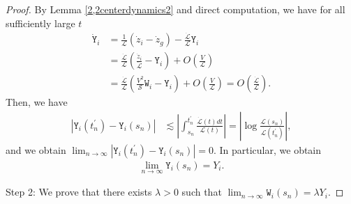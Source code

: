 \documentclass[10pt,a4paper]{amsart}
\numberwithin{equation}{section}
\begin{document}
\begin{proof}
By Lemma \ref{2,2centerdynamics2} and direct computation, we have for all sufficiently large $t$
\begin{align*}
\dot{\mathtt{Y}}_i&=\frac{1}{\mathcal{L}}\left(\dot{z}_i-\dot{z}_g\right)-\frac{\dot{\mathcal{L}}}{\mathcal{L}}\mathtt{Y}_i
\\
&=\frac{\dot{\mathcal{L}}}{\mathcal{L}}\left(\frac{\dot{z}_i}{\dot{\mathcal{L}}}-\mathtt{Y}_i\right)+O\left(\frac{V}{\mathcal{L}}\right)
\\
&=\frac{\dot{\mathcal{L}}}{\mathcal{L}}\left(\frac{V^2}{\mathcal{S}}\mathtt{W}_i-\mathtt{Y}_i \right)+O\left(\frac{V}{\mathcal{L}}\right)=O\left(\frac{\dot{\mathcal{L}}}{\mathcal{L}}\right).
\end{align*}
Then, we have
\begin{align*}
\left|\mathtt{Y}_i(t_n^{\prime})-\mathtt{Y}_i(s_n)\right|&\lesssim  \left|\int_{s_n}^{t_n^{\prime}}\frac{\dot{\mathcal{L}}(t)dt}{\mathcal{L}(t)} \right|=\left|\log{\frac{\mathcal{L}(s_n)}{\mathcal{L}(t_n^{\prime})}}\right|,
\end{align*}
and we obtain $\lim_{n\to\infty}\left|\mathtt{Y}_i(t_n^{\prime})-\mathtt{Y}_i(s_n)\right|=0$. In particular, we obtain
\begin{align}\label{Ynokyokugen0808}
\lim_{n\to\infty}\mathtt{Y}_i(s_n)=Y_i.
\end{align}


Step 2: We prove that there exists $\lambda>0$ such that $\lim_{n\to\infty}\mathtt{W}_i(s_n)=\lambda Y_i$.


\end{proof}
\end{document}
